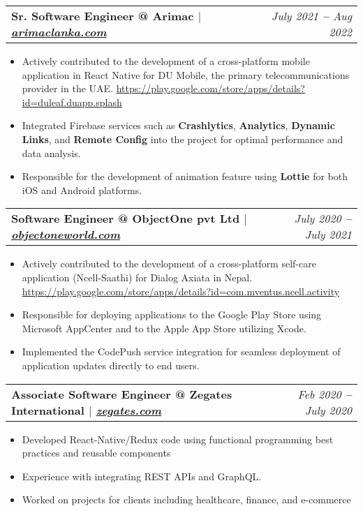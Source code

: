 \documentclass[letterpaper,11pt]{article}
\makeatletter
\newcommand{\resumeItem}[1]{
  \item\small{
    {#1 \vspace{-2pt}}
  }
}
\newcommand{\resumeSubheading}[2]{
  \vspace{-2pt}\item
    \begin{tabular*}{0.97\textwidth}[t]{l@{\extracolsep{\fill}}r}
      \textbf{\small#1} & \textit{\small #2} \\
    \end{tabular*}\vspace{-7pt}
}
\newcommand{\resumeItemListStart}{\begin{itemize}}
\newcommand{\resumeItemListEnd}{\end{itemize}\vspace{-5pt}}
\makeatother
\begin{document}
    \resumeSubheading
      {Sr. Software Engineer @ Arimac $|$  \footnotesize{\emph{\href{https://arimaclanka.com}{arimaclanka.com}}}}{\color{orange}July 2021 \textbf{--} Aug 2022}
      \vspace{4pt}
        \resumeItemListStart
            \resumeItem{Actively contributed to the development of a cross-platform mobile application in React Native for DU Mobile, the primary telecommunications provider in the UAE.}\href{https://play.google.com/store/apps/details?id=duleaf.duapp.splash}{\color{blue}https://play.google.com/store/apps/details?id=duleaf.duapp.splash}
            \resumeItem{Integrated Firebase services such as \textbf{Crashlytics}, \textbf{Analytics}, \textbf{Dynamic Links}, and \textbf{Remote Config} into the project for optimal performance and data analysis.}
            \resumeItem{Responsible for the development of  animation feature using \textbf{Lottie} for both iOS and Android platforms.}
        \resumeItemListEnd
        \vspace{16pt}

    \resumeSubheading
      {Software Engineer @ ObjectOne pvt Ltd $|$  \footnotesize{\emph{\href{https://www.objectoneworld.com}{objectoneworld.com}}}}{\color{orange}July 2020 \textbf{--} July 2021}
      \vspace{4pt}
        \resumeItemListStart
            \resumeItem{Actively contributed to the development of a cross-platform self-care application (Ncell-Saathi) for Dialog Axiata in Nepal.}\href{https://play.google.com/store/apps/details?id=com.mventus.ncell.activity}{\color{blue}https://play.google.com/store/apps/details?id=com.mventus.ncell.activity}
            \resumeItem{Responsible for deploying applications to the Google Play Store using Microsoft AppCenter and to the Apple App Store utilizing Xcode.}
            \resumeItem{Implemented the CodePush service integration for seamless deployment of application updates directly to end users.}
        \resumeItemListEnd
        \vspace{16pt}

    \resumeSubheading
      {Associate Software Engineer @ Zegates International $|$ \footnotesize{\emph{\href{https://zegates.com/}{zegates.com}}}}{\color{orange}Feb 2020 \textbf{--} July 2020}
      \vspace{4pt}
        \resumeItemListStart
            \resumeItem{Developed React-Native/Redux code using functional programming best practices and reusable components}
            \resumeItem{Experience with integrating REST APIs and GraphQL.}
            \resumeItem{Worked on projects for clients including healthcare, finance, and e-commerce}
        \resumeItemListEnd
        \vspace{16pt}
\end{document}
